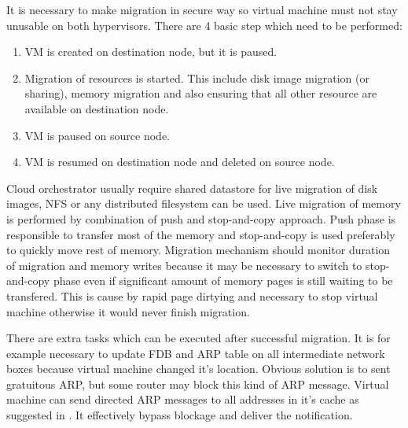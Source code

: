 It is necessary to make migration in secure way so virtual machine must not stay unusable on both hypervisors. There are 4 basic step which need to be performed:
\begin{enumerate}
	\item \Ac{VM} is created on destination node, but it is paused.
	\item Migration of resources is started. This include disk image migration (or sharing), memory migration and also ensuring that all other resource are available on destination node.
	\item \Ac{VM} is paused on source node.
	\item \Ac{VM} is resumed on destination node and deleted on source node.
\end{enumerate}

Cloud orchestrator usually require shared datastore for live migration of disk images, \Ac{NFS} or any distributed filesystem can be used. Live migration of 
memory is performed by combination of push and stop-and-copy approach. Push phase is responsible to transfer most of the memory and stop-and-copy is used preferably to quickly move rest of memory. Migration mechanism should monitor duration of migration and memory writes because it may be necessary to switch to stop-and-copy phase even if significant amount of memory pages is still waiting to be transfered. This is cause by rapid page dirtying and necessary to stop virtual machine otherwise it would never finish migration.


There are extra tasks which can be executed after successful migration. It is for example necessary to update \Ac{FDB} and \Ac{ARP} table on all intermediate network boxes because virtual machine changed it's location. Obvious solution is to sent gratuitous \Ac{ARP}, but some router may block this kind of \Ac{ARP} message. Virtual machine can send directed \Ac{ARP} messages to all addresses in it's cache as suggested in \cite{live-migration-of-vms}. It effectively bypass blockage and deliver the notification.
